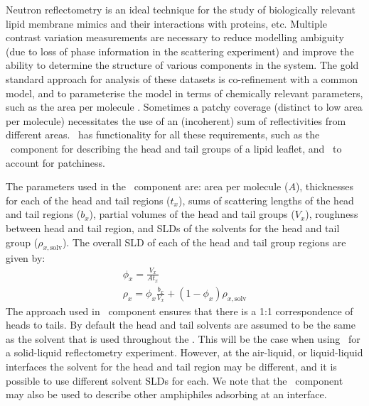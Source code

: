 \documentclass[pdf,preprint]{article}
\begin{document}
Neutron reflectometry is an ideal technique for the study of biologically relevant lipid membrane mimics and their interactions with proteins, etc. Multiple contrast variation measurements are necessary to reduce modelling ambiguity (due to loss of phase information in the scattering experiment) and improve the ability to determine the structure of various components in the system. The gold standard approach for analysis of these datasets is co-refinement with a common model, and to parameterise the model in terms of chemically relevant parameters, such as the area per molecule \cite{campbell2018}. Sometimes a patchy coverage (distinct to low area per molecule) necessitates the use of an (incoherent) sum of reflectivities from different areas. \ has functionality for all these requirements, such as the \LipidLeaflet\ component for describing the head and tail groups of a lipid leaflet, and \MixedReflectModel\ to account for patchiness.

The parameters used in the \LipidLeaflet\ component are: area per molecule ($A$), thicknesses for each of the head and tail regions ($t_x$), sums of scattering lengths of the head and tail regions ($b_x$), partial volumes of the head and tail groups ($V_x$), roughness between head and tail region, and SLDs of the solvents for the head and tail group ($\rho_{x,\mathrm{solv}}$). The overall SLD of each of the head and tail group regions are given by:
\begin{gather} 
\label{eqn:3} \phi_{x} = \frac{V_x}{At_x}\\
\rho_x =  \phi_{x} \frac{b_x}{V_x} + (1 - \phi_{x})\rho_{x,\mathrm{solv}} \label{eqn:4}
\end{gather}
The approach used in \LipidLeaflet\ component ensures that there is a 1:1 correspondence of heads to tails.
By default the head and tail solvents are assumed to be the same as the solvent that is used throughout the \Structure. This will be the case when using \LipidLeaflet\ for a solid-liquid reflectometry experiment. However, at the air-liquid, or liquid-liquid interfaces the solvent for the head and tail region may be different, and it is possible to use different solvent SLDs for each. We note that the \LipidLeaflet\ component may also be used to describe other amphiphiles adsorbing at an interface.
\end{document}
